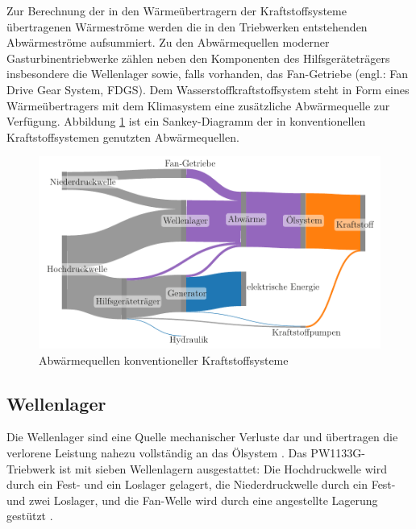Zur Berechnung der in den Wärmeübertragern der Kraftstoffsysteme übertragenen Wärmeströme werden die in den Triebwerken entstehenden Abwärmeströme aufsummiert. Zu den Abwärmequellen moderner Gasturbinentriebwerke zählen neben den Komponenten des Hilfsgeräteträgers insbesondere die Wellenlager sowie, falls vorhanden, das Fan-Getriebe (engl.: Fan Drive Gear System, FDGS). Dem Wasserstoffkraftstoffsystem steht in Form eines Wärmeübertragers mit dem Klimasystem eine zusätzliche Abwärmequelle zur Verfügung. Abbildung \ref{fig:sankey} ist ein Sankey-Diagramm der in konventionellen Kraftstoffsystemen genutzten Abwärmequellen.

\begin{figure}[ht]
\centering
\includegraphics[width=1\linewidth]{4_Abbildungen/2_Hauptteil/sankey.pdf}
  \caption{Abwärmequellen konventioneller Kraftstoffsysteme}
  \label{fig:sankey}
\end{figure}
\FloatBarrier 

\subsection{Wellenlager}

Die Wellenlager sind eine Quelle mechanischer Verluste dar und übertragen die verlorene Leistung nahezu vollständig an das Ölsystem \cite{Gloeckner.2017}. Das PW1133G-Triebwerk ist mit sieben Wellenlagern ausgestattet: Die Hochdruckwelle wird durch ein Fest- und ein Loslager gelagert, die Niederdruckwelle durch ein Fest- und zwei Loslager, und die Fan-Welle wird durch eine angestellte Lagerung gestützt \cite{AviationKnowledge.2022}. 

